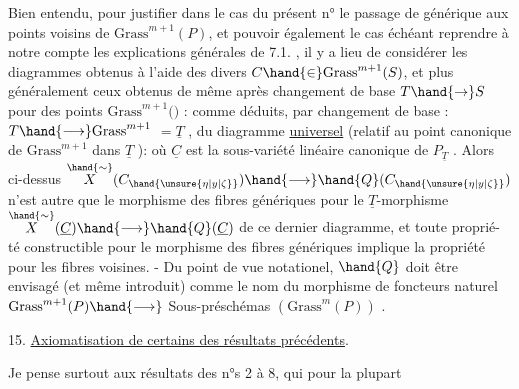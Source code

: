 
Bien entendu, pour justifier dans le cas  du présent n° le passage
de \hand{$\eta$} générique aux points voisins de $\mathrm{Grass}^{m+1}(P)$, et pouvoir également
le cas échéant reprendre à notre compte les explications générales de
7.1. , il y a lieu de considérer les diagrammes
obtenus à l'aide des divers $C \hand{\in} \mathrm{Grass}^{m+1}(S)$, et plus généralement ceux obtenus de même
après changement de base $T \hand{\to} S$ pour des points \hand{$\unsure{\xi|\zeta}$} \hand{$\in$} $\mathrm{Grass}^{m+1}($$)$ :
\diagram{\[\begin{array}{ccc}
X_T & \hand{\longleftarrow} & \overset{\hand{\sim}}{X}(C_{\hand{\unsure{\xi|\zeta}}}) = \overset{\hand{\sim}}{X}_T(C_{\hand{\unsure{\xi|\zeta}}}) \\
\hand{\downarrow} & & \hand{\downarrow} \\
T & \hand{\longleftarrow} & \hand{Q}(C_{\hand{\unsure{\xi|\zeta}}})
\end{array}\]}
comme déduits, par changement de base \hand{$\unsure{\xi|\zeta}$} : $T \hand{\longrightarrow} \mathrm{Grass}^{m+1}$ $= \underline{T}$ ,
du diagramme \uline{universel} (relatif au point canonique de $\mathrm{Grass}^{m+1}$ dans $\underline{T}$ ):
où $\underline{C}$ est la sous-variété linéaire canonique de $P_{\underline{T}}$ . Alors ci-dessus
$\overset{\hand{\sim}}{X}(C_{\hand{\unsure{\eta|y|\zeta}}}) \hand{\longrightarrow} \hand{Q}(C_{\hand{\unsure{\eta|y|\zeta}}})$ n'est autre que le morphisme des fibres génériques pour
le $\underline{T}$-morphisme $\overset{\hand{\sim}}{X}(\underline{C}) \hand{\longrightarrow} \hand{Q}(\underline{C})$ de ce dernier diagramme, et toute propri\'e-%
té constructible pour  le morphisme des fibres génériques implique
la propriété pour les fibres voisines. - Du point de vue notationel,
$\hand{Q}$ doit être envisagé (et même introduit) comme le nom du morphisme de foncteurs
naturel $\mathrm{Grass}^{m+1}(P) \hand{\longrightarrow}$  Sous-préschémas $(\mathrm{Grass}^{m}(P))$ .

15. \uline{Axiomatisation de certains des résultats précédents}.

Je pense surtout aux résultats des n°s 2 à 8, qui pour la plupart


